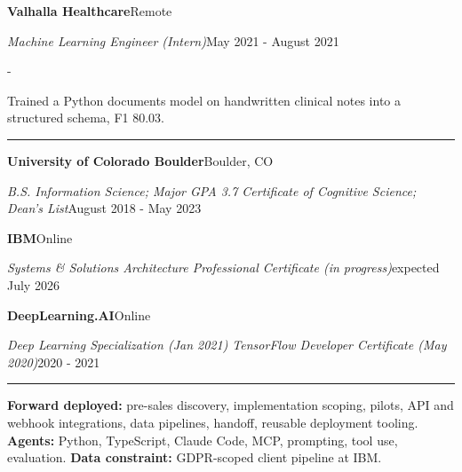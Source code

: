 \documentclass[10pt,letterpaper]{article}
\newenvironment{cvitems}{%
  \begin{list}{-}{%
    \setlength{\leftmargin}{12pt}%
    \setlength{\itemsep}{1.2pt}%
    \setlength{\parsep}{0pt}%
    \setlength{\topsep}{1.5pt}%
    \setlength{\partopsep}{0pt}%
    \setlength{\labelwidth}{6pt}%
    \setlength{\labelsep}{6pt}%
    \setlength{\itemindent}{0pt}%
  }%
}{\end{list}}
\newcommand{\cvsection}[1]{%
  \vspace{7pt}%
  \noindent{\bfseries\fontsize{11pt}{13pt}\selectfont\MakeUppercase{#1}}\par
  \vspace{1pt}%
  \noindent\rule{\textwidth}{0.4pt}\par
  \vspace{4pt}%
}
\newcommand{\cventryhead}[4]{%
  \noindent\textbf{#1}\hfill#2\par
  \vspace{0.5pt}%
  \noindent\textit{#3}\hfill#4\par
}
\newcommand{\cveduhead}[4]{%
  \noindent\textbf{#1}\hfill#2\par
  \vspace{0.5pt}%
  \noindent\textit{#3}\hfill#4\par
}
\begin{document}
\vspace{3pt}
\cventryhead{Valhalla Healthcare}{Remote}
{Machine Learning Engineer (Intern)}{May 2021 - August 2021}
\begin{cvitems}
  \item Trained a Python documents model on handwritten clinical notes into a structured schema, F1 80.03.
\end{cvitems}

\cvsection{Education}

\cveduhead{University of Colorado Boulder}{Boulder, CO}
{B.S. Information Science; Major GPA 3.7 \textbar{} Certificate of Cognitive Science; Dean's List}{August 2018 - May 2023}

\vspace{3pt}
\cveduhead{IBM}{Online}
{Systems \& Solutions Architecture Professional Certificate (in progress)}{expected July 2026}

\vspace{3pt}
\cveduhead{DeepLearning.AI}{Online}
{Deep Learning Specialization (Jan 2021) \textbar{} TensorFlow Developer Certificate (May 2020)}{2020 - 2021}

\cvsection{Skills}

{\raggedright
\noindent\textbf{Forward deployed:} pre-sales discovery, implementation scoping, pilots, API and webhook integrations, data pipelines, handoff, reusable deployment tooling. \textbf{Agents:} Python, TypeScript, Claude Code, MCP, prompting, tool use, evaluation. \textbf{Data constraint:} GDPR-scoped client pipeline at IBM.\par
}
\end{document}
